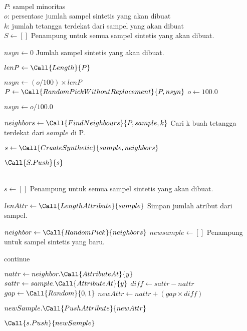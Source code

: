 \begin{center}
	\label{alg:smote}
	\begin{algorithmic}[1]
\Require \\
$ P $: sampel minoritas \\
$ o $: persentase jumlah sampel sintetis yang akan dibuat \\
$ k $: jumlah tetangga terdekat dari sampel yang akan dibuat
\\
	\State $ S \gets [] $
	\Comment Penampung untuk semua sampel sintetis yang akan dibuat.

	\State $ nsyn \gets 0 $
	\Comment Jumlah sampel sintetis yang akan dibuat.

	\State $ lenP \gets \Call{Length}{P} $

		\State $ nsyn \gets (o / 100) \times lenP $
		\State $ P \gets \Call{RandomPickWithoutReplacement}{P, nsyn} $
		\State $ o \gets 100.0 $
	\EndIf

	\State $ nsyn \gets o / 100.0 $

		\State $ neighbors \gets \Call{FindNeighbours}{P, sample, k} $
		\Comment Cari k buah tetangga terdekat dari $sample$ di P.

		\State $ s \gets \Call{CreateSynthetic}{sample, neighbors} $

		\State $ \Call{S.Push}{s} $
	\EndFor

	\State {}
\EndFunction
\\
	\State $ s \gets [] $
	\Comment Penampung untuk semua sampel sintetis yang akan dibuat.

	\State $ lenAttr \gets \Call{LengthAttribute}{sample} $
	\Comment Simpan jumlah atribut dari sampel.

		\State $ neighbor \gets \Call{RandomPick}{neighbors} $
		\State $ newsample \gets [] $
		\Comment Penampung untuk sampel sintetis yang baru.

				\State continue
			\EndIf

			\State $ nattr \gets neighbor.\Call{AttributeAt}{y} $
			\State $ sattr \gets sample.\Call{AttributeAt}{y} $
			\State $ diff \gets sattr - nattr $
			\State $ gap \gets \Call{Random}{0,1} $
			\State $ newAttr \gets nattr + (gap \times diff) $

			\State $ newSample.\Call{PushAttribute}{newAttr} $
		\EndFor

		\State $ \Call{s.Push}{newSample} $
	\EndFor

	\State {}
\EndFunction

	\end{algorithmic}
\end{center}
